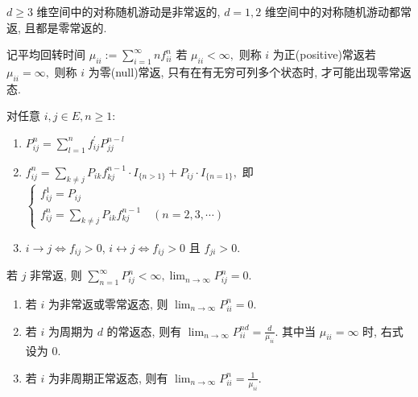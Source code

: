 \documentclass[10pt]{yerbaformat}
\begin{document}
\begin{theorem}[Polya 定理]
    $d \geq 3$ 维空间中的对称随机游动是非常返的, $d=1,2$ 维空间中的对称随机游动都常返, 且都是零常返的.
\end{theorem}

\begin{definition}[正常返与零常返]
    记平均回转时间 $\mu_{i i}:=\sum_{i=1}^{\infty} n f_{i i}^{n}$ 若 $\mu_{i i}<\infty,$ 则称 $i$ 为正(positive)常返若 $\mu_{i i}=\infty,$ 则称 $i$ 为零(null)常返, 只有在有无穷可列多个状态时, 才可能出现零常返态.
\end{definition}

\begin{theorem}
    对任意 $i, j \in E, n \geq 1$:
    \begin{enumerate}
        \item $P_{i j}^{n}=\sum_{l=1}^{n} f_{i j}^{\prime} P_{j j}^{n-l}$
        \item $f_{i j}^{n}=\sum_{k \neq j} P_{i k} f_{k j}^{n-1} \cdot I_{\{n>1\}}+P_{i j} \cdot I_{\{n=1\}},$ 即 $\left\{\begin{array}{l}f_{i j}^{1}=P_{i j} \\ f_{i j}^{n}=\sum_{k \neq j} P_{i k} f_{k j}^{n-1} \quad(n=2,3, \cdots)\end{array}\right.$
        \item $i \rightarrow j \Leftrightarrow f_{i j}>0$,
              $i \leftrightarrow j \Leftrightarrow f_{i j}>0$ 且 $f_{j i}>0 .$
    \end{enumerate}
\end{theorem}

\begin{corollary}
    若 $j$ 非常返, 则 $\sum_{n=1}^{\infty} P_{i j}^{n}<\infty, \lim _{n \rightarrow \infty} P_{i j}^{n}=0 .$
\end{corollary}

\begin{theorem}[基本极限定理]
    \begin{enumerate}
        \item 若 $i$ 为非常返或零常返态, 则 $\lim _{n \rightarrow \infty} P_{i i}^{n}=0 .$
        \item 若 $i$ 为周期为 $d$ 的常返态, 则有 $\lim _{n \rightarrow \infty} P_{i i}^{n d}=\frac{d}{\mu_{i i}}$.
              其中当 $\mu_{i i}=\infty$ 时, 右式设为 $0 .$
        \item 若 $i$ 为非周期正常返态, 则有 $\lim _{n \rightarrow \infty} P_{i i}^{n}=\frac{1}{\mu_{i i}}$.
    \end{enumerate}
\end{theorem}
\end{document}
